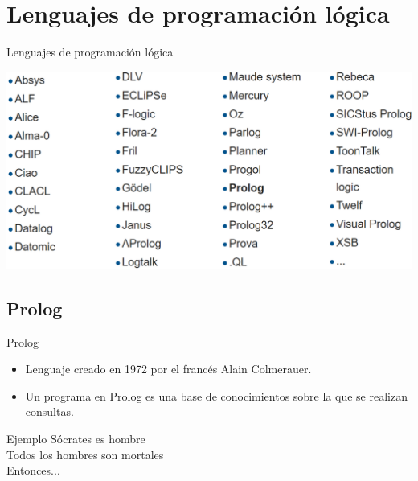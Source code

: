 \documentclass[handout]{beamer} %
\begin{document}
\section{Lenguajes de programación lógica}


\begin{frame}{Lenguajes de programación lógica}
  \begin{center}
    \includegraphics[width=\textwidth]{./image/cap8/lenguajes-logicos.png}
  \end{center}
\end{frame}

\subsection{Prolog}

\begin{frame}{Prolog}
    \begin{itemize}
        \item Lenguaje creado en 1972 por el francés Alain Colmerauer.
        \item Un programa en Prolog es una base de conocimientos sobre la que se realizan consultas.
    \end{itemize}
    \begin{block}{Ejemplo}
        Sócrates es hombre\\
        Todos los hombres son mortales\\[2ex]
        
        Entonces... 
    \end{block}
\end{frame}
\end{document}
